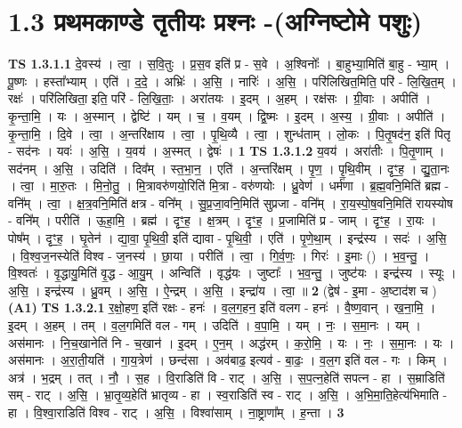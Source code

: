 \documentclass[17pt]{extarticle}
\begin{document}
\section*{ 1.3     प्रथमकाण्डे तृतीयः प्रश्नः -(अग्निष्टोमे पशुः) }
                                \textbf{ TS 1.3.1.1} \newline
                  दे॒वस्य॑ । त्वा॒ । स॒वि॒तुः । प्र॒स॒व इति॑ प्र - स॒वे । अ॒श्विनोः᳚ । बा॒हुभ्या॒मिति॑ बा॒हु - भ्या॒म् । पू॒ष्णः । हस्ता᳚भ्याम् । एति॑ । द॒दे॒ । अभ्रिः॑ । अ॒सि॒ । नारिः॑ । अ॒सि॒ । परि॑लिखित॒मिति॒ परि॑ - लि॒खि॒त॒म् । रक्षः॑ । परि॑लिखिता॒ इति॒ परि॑ - लि॒खि॒ताः॒ । अरा॑तयः । इ॒दम् । अ॒हम् । रक्ष॑सः । ग्री॒वाः । अपीति॑ । कृ॒न्ता॒मि॒ । यः । अ॒स्मान् । द्वेष्टि॑ । यम् । च॒ । व॒यम् । द्वि॒ष्मः । इ॒दम् । अ॒स्य॒ । ग्री॒वाः । अपीति॑ । कृ॒न्ता॒मि॒ । दि॒वे । त्वा॒ । अ॒न्तरि॑क्षाय । त्वा॒ । पृ॒थि॒व्यै । त्वा॒ । शुन्ध॑ताम् । लो॒कः । पि॒तृ॒षद॑न॒ इति॑ पितृ - सद॑नः । यवः॑ । अ॒सि॒ । य॒वय॑ । अ॒स्मत् । द्वेषः॑ । \textbf{  1} \newline
                  \newline
                                \textbf{ TS 1.3.1.2} \newline
                  य॒वय॑ । अरा॑तीः । पि॒तृ॒णाम् । सद॑नम् । अ॒सि॒ । उदिति॑ । दिव᳚म् । स्त॒भा॒न॒ । एति॑ । अ॒न्तरि॑क्षम् । पृ॒ण॒ । पृ॒थि॒वीम् । दृꣳ॒॒ह॒ । द्यु॒ता॒नः । त्वा॒ । मा॒रु॒तः । मि॒नो॒तु॒ । मि॒॒त्रावरु॑णयो॒रिति॑ मि॒त्रा - वरु॑णयोः । ध्रु॒वेण॑ । धर्म॑णा । ब्र॒ह्म॒वनि॒मिति॑ ब्रह्म - वनि᳚म् । त्वा॒ । क्ष॒त्र॒वनि॒मिति॑ क्षत्र - वनि᳚म् । सु॒प्र॒जा॒वनि॒मिति॑ सुप्रजा - वनि᳚म् । रा॒य॒स्पो॒ष॒वनि॒मिति॑ रायस्योष - वनि᳚म् । परीति॑ । ऊ॒हा॒मि॒ । ब्रह्म॑ । दृꣳ॒॒ह॒ । क्ष॒त्रम् । दृꣳ॒॒ह॒ । प्र॒जामिति॑ प्र - जाम् । दृꣳ॒॒ह॒ । रा॒यः । पोष᳚म् । दृꣳ॒॒ह॒ । घृ॒तेन॑ । द्या॒वा॒ पृ॒थि॒वी॒ इति॑ द्यावा - पृ॒थि॒वी॒ । एति॑ । पृ॒णे॒था॒म् । इन्द्र॑स्य । सदः॑ । अ॒सि॒ । वि॒श्व॒ज॒नस्येति॑ विश्व - ज॒नस्य॑ । छा॒या । परीति॑ । त्वा॒ । गि॒र्व॒णः॒ । गिरः॑ । इ॒माः () । भ॒व॒न्तु॒ । वि॒श्वतः॑ । वृ॒द्धायु॒मिति॑ वृ॒द्ध - आ॒यु॒म् । अन्विति॑ । वृद्ध॑यः । जुष्टाः᳚ । भ॒व॒न्तु॒ । जुष्ट॑यः । इन्द्र॑स्य । स्यूः । अ॒सि॒ । इन्द्र॑स्य । ध्रु॒वम् । अ॒सि॒ । ऐ॒न्द्रम् । अ॒सि॒ । इन्द्रा॑य । त्वा॒ ॥ \textbf{  2 } \newline
                  \newline
                      (द्वेष॑ - इ॒मा - अ॒ष्टाद॑श च )  \textbf{(A1)} \newline \newline
                                \textbf{ TS 1.3.2.1} \newline
                  र॒क्षो॒हण॒ इति॑ रक्षः - हनः॑ । व॒ल॒ग॒हन॒ इति॑ वलग - हनः॑ । वै॒ष्ण॒वान् । ख॒ना॒मि॒ । इ॒दम् । अ॒हम् । तम् । व॒ल॒गमिति॑ वल - गम् । उदिति॑ । व॒पा॒मि॒ । यम् । नः॒ । स॒मा॒नः । यम् । अस॑मानः । नि॒च॒खानेति॑ नि - च॒खान॑ । इ॒दम् । ए॒न॒म् । अद्ध॑रम् । क॒रो॒मि॒ । यः । नः॒ । स॒मा॒नः । यः । अस॑मानः । अ॒रा॒ती॒यति॑ । गा॒य॒त्रेण॑ । छन्द॑सा । अव॑बाढ॒ इत्यव॑ - बा॒ढः॒ । व॒ल॒ग इति॑ वल - गः । किम् । अत्र॑ । भ॒द्रम् । तत् । नौ॒ । स॒ह । वि॒राडिति॑ वि - राट् । अ॒सि॒ । स॒प॒त्न॒हेति॑ सपत्न - हा । स॒म्राडिति॑ सम् - राट् । अ॒सि॒ । भ्रा॒तृ॒व्य॒हेति॑ भ्रातृव्य - हा । स्व॒राडिति॑ स्व - राट् । अ॒सि॒ । अ॒भि॒मा॒ति॒हेत्य॑भिमाति - हा । वि॒श्वा॒राडिति॑ विश्व - राट् । अ॒सि॒ । विश्वा॑साम् । ना॒ष्ट्राणा᳚म् । ह॒न्ता । \textbf{  3 } \newline
\end{document}
